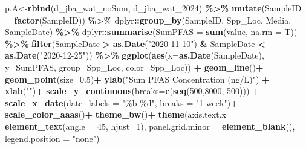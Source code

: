 \documentclass[
]{article}
\newenvironment{Shaded}{\begin{snugshade}}{\end{snugshade}}
\newcommand{\AttributeTok}[1]{\textcolor[rgb]{0.13,0.29,0.53}{#1}}
\newcommand{\DecValTok}[1]{\textcolor[rgb]{0.00,0.00,0.81}{#1}}
\newcommand{\FloatTok}[1]{\textcolor[rgb]{0.00,0.00,0.81}{#1}}
\newcommand{\FunctionTok}[1]{\textcolor[rgb]{0.13,0.29,0.53}{\textbf{#1}}}
\newcommand{\NormalTok}[1]{#1}
\newcommand{\OtherTok}[1]{\textcolor[rgb]{0.56,0.35,0.01}{#1}}
\newcommand{\SpecialCharTok}[1]{\textcolor[rgb]{0.81,0.36,0.00}{\textbf{#1}}}
\newcommand{\StringTok}[1]{\textcolor[rgb]{0.31,0.60,0.02}{#1}}
\begin{document}
\begin{Shaded}
\begin{Highlighting}[]
\NormalTok{p.A}\OtherTok{\textless{}{-}}\FunctionTok{rbind}\NormalTok{(d\_jba\_wat\_noSum, d\_jba\_wat\_2024) }\SpecialCharTok{\%\textgreater{}\%}
  \FunctionTok{mutate}\NormalTok{(}\AttributeTok{SampleID =} \FunctionTok{factor}\NormalTok{(SampleID)) }\SpecialCharTok{\%\textgreater{}\%}
\NormalTok{  dplyr}\SpecialCharTok{::}\FunctionTok{group\_by}\NormalTok{(SampleID, Spp\_Loc, Media, SampleDate) }\SpecialCharTok{\%\textgreater{}\%}
\NormalTok{  dplyr}\SpecialCharTok{::}\FunctionTok{summarise}\NormalTok{(}\AttributeTok{SumPFAS =} \FunctionTok{sum}\NormalTok{(value, }\AttributeTok{na.rm =}\NormalTok{ T)) }\SpecialCharTok{\%\textgreater{}\%}
  \FunctionTok{filter}\NormalTok{(SampleDate }\SpecialCharTok{\textgreater{}} \FunctionTok{as.Date}\NormalTok{(}\StringTok{"2020{-}11{-}10"}\NormalTok{) }\SpecialCharTok{\&}\NormalTok{ SampleDate }\SpecialCharTok{\textless{}} \FunctionTok{as.Date}\NormalTok{(}\StringTok{"2020{-}12{-}25"}\NormalTok{)) }\SpecialCharTok{\%\textgreater{}\%}     \FunctionTok{ggplot}\NormalTok{(}\FunctionTok{aes}\NormalTok{(}\AttributeTok{x=}\FunctionTok{as.Date}\NormalTok{(SampleDate), }\AttributeTok{y=}\NormalTok{SumPFAS, }\AttributeTok{group=}\NormalTok{Spp\_Loc, }\AttributeTok{color=}\NormalTok{Spp\_Loc)) }\SpecialCharTok{+}
    \FunctionTok{geom\_line}\NormalTok{()}\SpecialCharTok{+}
    \FunctionTok{geom\_point}\NormalTok{(}\AttributeTok{size=}\FloatTok{0.5}\NormalTok{)}\SpecialCharTok{+}
    \FunctionTok{ylab}\NormalTok{(}\StringTok{"Sum PFAS Concentration (ng/L)"}\NormalTok{) }\SpecialCharTok{+}
    \FunctionTok{xlab}\NormalTok{(}\StringTok{""}\NormalTok{)}\SpecialCharTok{+}
    \FunctionTok{scale\_y\_continuous}\NormalTok{(}\AttributeTok{breaks=}\FunctionTok{c}\NormalTok{(}\FunctionTok{seq}\NormalTok{(}\DecValTok{500}\NormalTok{,}\DecValTok{8000}\NormalTok{, }\DecValTok{500}\NormalTok{))) }\SpecialCharTok{+}
    \FunctionTok{scale\_x\_date}\NormalTok{(}\AttributeTok{date\_labels =} \StringTok{"\%b \%d"}\NormalTok{, }\AttributeTok{breaks =} \StringTok{"1 week"}\NormalTok{)}\SpecialCharTok{+}
    \FunctionTok{scale\_color\_aaas}\NormalTok{()}\SpecialCharTok{+}
    \FunctionTok{theme\_bw}\NormalTok{()}\SpecialCharTok{+}
    \FunctionTok{theme}\NormalTok{(}\AttributeTok{axis.text.x =} \FunctionTok{element\_text}\NormalTok{(}\AttributeTok{angle =} \DecValTok{45}\NormalTok{, }\AttributeTok{hjust=}\DecValTok{1}\NormalTok{),}
          \AttributeTok{panel.grid.minor =} \FunctionTok{element\_blank}\NormalTok{(),}
          \AttributeTok{legend.position =} \StringTok{"none"}\NormalTok{)}



\end{Highlighting}
\end{Shaded}
\end{document}
